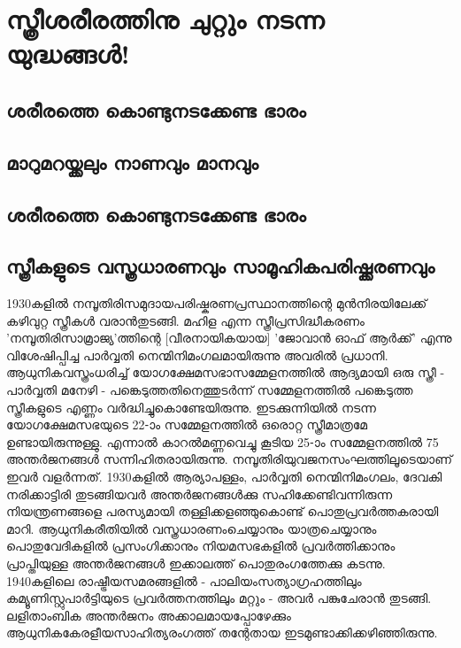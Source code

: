 \chapter{സ്ത്രീശരീരത്തിനു ചുറ്റും നടന്ന യുദ്ധങ്ങൾ!}
\label{chapter7}
\section{ശരീരത്തെ കൊണ്ടുനടക്കേണ്ട ഭാരം}
\label{ch7sec1}
\section{മാറുമറയ്ക്കലും നാണവും മാനവും}
\label{ch7sec2}
\section{ശരീരത്തെ കൊണ്ടുനടക്കേണ്ട ഭാരം}
\label{ch7sec3}
\section{സ്ത്രീകളുടെ വസ്ത്രധാരണവും സാമൂഹികപരിഷ്ക്കരണവും}
\label{ch7sec4}
\label{ch7box2} %
\begin{tcolorbox}[%
 breakable, %
  arc=0mm, 
  left=1pt, right = 1pt, 
  boxrule=0mm,
  colback = {blue!10}, %
] 
\noindent 1930കളിൽ നമ്പൂതിരിസമുദായപരിഷ്കരണപ്രസ്ഥാനത്തിന്റെ മുൻനിരയിലേക്ക് കഴിവുറ്റ സ്ത്രീകൾ വരാൻതുടങ്ങി. മഹിള എന്ന സ്ത്രീപ്രസിദ്ധീകരണം 'നമ്പൂതിരിസാമ്രാജ്യ'ത്തിന്റെ [വീരനായികയായ] 'ജോവാൻ ഓഫ് ആർക്ക്' എന്നു വിശേഷിപ്പിച്ച പാർവ്വതി നെന്മിനിമംഗലമായിരുന്നു അവരിൽ പ്രധാനി. ആധുനികവസ്ത്രംധരിച്ച് യോഗക്ഷേമസഭാസമ്മേളനത്തിൽ ആദ്യമായി ഒരു സ്ത്രീ - പാർവ്വതി മനേഴി - പങ്കെടുത്തതിനെത്തുടർന്ന് സമ്മേളനത്തിൽ പങ്കെടുത്ത സ്ത്രീകളുടെ എണ്ണം വർദ്ധിച്ചുകൊണ്ടേയിരുന്നു. ഇടക്കുന്നിയിൽ നടന്ന യോഗക്ഷേമസഭയുടെ 22-ാം സമ്മേളനത്തിൽ ഒരൊറ്റ സ്ത്രീമാത്രമേ ഉണ്ടായിരുന്നുള്ളു. എന്നാൽ കാറൽമണ്ണവെച്ചു കൂടിയ 25-ാം സമ്മേളനത്തിൽ 75 അന്തർജനങ്ങൾ സന്നിഹിതരായിരുന്നു. നമ്പൂതിരിയുവജനസംഘത്തിലൂടെയാണ് ഇവർ വളർന്നത്. 1930കളിൽ ആര്യാപള്ളം, പാർവ്വതി നെന്മിനിമംഗലം, ദേവകി നരിക്കാട്ടിരി തുടങ്ങിയവർ അന്തർജനങ്ങൾക്കു സഹിക്കേണ്ടിവന്നിരുന്ന നിയന്ത്രണങ്ങളെ പരസ്യമായി തള്ളിക്കളഞ്ഞുകൊണ്ട് പൊതുപ്രവർത്തകരായി മാറി. ആധുനികരീതിയിൽ വസ്ത്രധാരണംചെയ്യാനും യാത്രചെയ്യാനും പൊതുവേദികളിൽ പ്രസംഗിക്കാനും നിയമസഭകളിൽ പ്രവർത്തിക്കാനും പ്രാപ്തിയുള്ള അന്തർജനങ്ങൾ ഇക്കാലത്ത് പൊതുരംഗത്തേക്കു കടന്നു. 1940കളിലെ രാഷ്ട്രീയസമരങ്ങളിൽ - പാലിയംസത്യാഗ്രഹത്തിലും കമ്യൂണിസ്റ്റുപാർട്ടിയുടെ പ്രവർത്തനത്തിലും മറ്റും - അവർ പങ്കുചേരാൻ തുടങ്ങി. ലളിതാംബിക അന്തർജനം അക്കാലമായപ്പോഴേക്കും ആധുനികകേരളീയസാഹിത്യരംഗത്ത് തന്റേതായ ഇടമുണ്ടാക്കിക്കഴിഞ്ഞിരുന്നു.
\end{tcolorbox}

